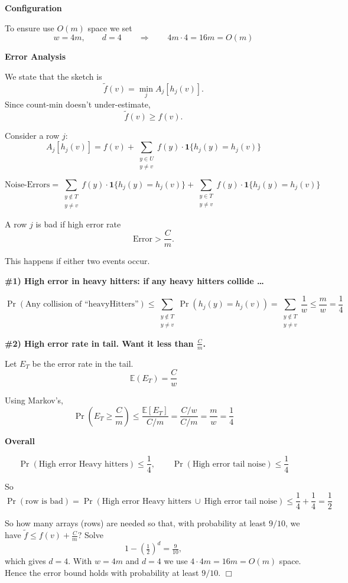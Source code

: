 \documentclass[11pt]{article}
\begin{document}
\textbf{Configuration}\; 

To ensure use $O(m)$ space we set
\[ w=4m,\qquad d=4 \qquad\Longrightarrow\qquad 4m\cdot 4 = 16m = O(m) \]

\bigskip
\textbf{Error Analysis}

We state that the sketch is
\[ \tilde f(v)=\min_{j} A_j[h_j(v)]. \]
Since count-min doesn't under-estimate,
\[ \tilde f(v)\ge f(v). \]

Consider a row $j$:
\[ A_j[h_j(v)] = f(v) + \sum_{\substack{y\in U\\ y\neq v}} f(y)\cdot \mathbf{1}\{h_j(y)=h_j(v)\} \]

\[\text{Noise-Errors} =
\sum_{\substack{y\notin T\\ y\neq v}} f(y)\cdot \mathbf{1}\{h_j(y)=h_j(v)\}
+
\sum_{\substack{y\in T\\ y\neq v}} f(y)\cdot \mathbf{1}\{h_j(y)=h_j(v)\}
\]

A row $j$ is bad if high error rate
\[ \text{Error} > \frac{C}{m}. \]

This happens if either two events occur.

\textbf{\#1) High error in heavy hitters: if any heavy hitters collide \ldots}

\[ \Pr(\text{Any collision of ``heavyHitters''})\le \sum_{\substack{y\notin T\\ y\neq v}} \Pr(h_j(y)=h_j(v))
= \sum_{\substack{y\notin T\\ y\neq v}} \frac{1}{w} \le \frac{m}{w} = \frac{1}{4} \]

\textbf{\#2) High error rate in tail. Want it less than $\frac{C}{m}$.}

Let $E_T$ be the error rate in the tail.
\[ \mathbb{E}(E_T)=\frac{C}{w} \]

Using Markov's,
\[ \Pr\!\left(E_T \ge \frac{C}{m}\right) \le \frac{\mathbb{E}[E_T]}{C/m} = \frac{C/w}{C/m} = \frac{m}{w} = \frac{1}{4} \]

\textbf{Overall}

\[ \Pr(\text{High error Heavy hitters}) \le \frac{1}{4},
\qquad
\Pr(\text{High error tail noise}) \le \frac{1}{4} \]

So
\[ \Pr(\text{row is bad}) = \Pr(\text{High error Heavy hitters} \ \cup\ \text{High error tail noise}) \le \frac{1}{4}+\frac{1}{4} = \frac{1}{2} \]

So how many arrays (rows) are needed so that, with probability at least $9/10$, we have
\(\tilde f \le f(v)+\frac{C}{m}\)? Solve
\[
1-\left(\tfrac{1}{2}\right)^d = \tfrac{9}{10},
\]
which gives $d=4$. With $w=4m$ and $d=4$ we use $4\cdot 4m=16m=O(m)$ space. Hence the error bound holds with probability at least $9/10$. \(\Box\)
\end{document}
